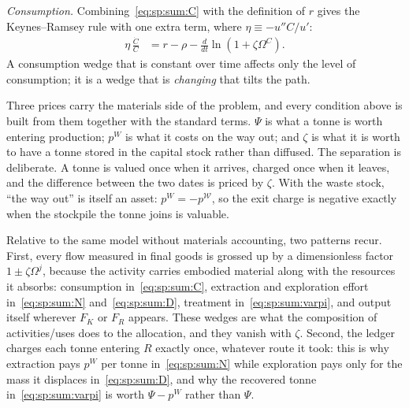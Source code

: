 \emph{Consumption.} Combining~\eqref{eq:sp:sum:C} with the definition of $r$ gives the Keynes--Ramsey rule with one extra term, where $\eta\equiv-u''C/u'$:
\begin{align}
\eta\,\frac{\dot C}{C} &= r-\rho-\frac{d}{dt}\ln\left(1+\zeta\Omega^C\right).
\label{eq:sp:sum:Cgrowth}
\end{align}
A consumption wedge that is constant over time affects only the level of consumption; it is a wedge that is \emph{changing} that tilts the path.



 Three prices carry the materials side of the problem, and every condition above is built from them together with the standard terms. $\Psi$ is what a tonne is worth entering production; $p^W$ is what it costs on the way out; and $\zeta$ is what it is worth to have a tonne stored in the capital stock rather than diffused. The separation is deliberate. A tonne is valued once when it arrives, charged once when it leaves, and the difference between the two dates is priced by $\zeta$. With the waste stock, ``the way out'' is itself an asset: $p^W=-p^{\mathcal W}$, so the exit charge is negative exactly when the stockpile the tonne joins is valuable.

Relative to the same model without materials accounting, two patterns recur. First, every flow measured in final goods is grossed up by a dimensionless factor $1\pm\zeta\Omega^j$, because the activity carries embodied material along with the resources it absorbs: consumption in~\eqref{eq:sp:sum:C}, extraction and exploration effort in~\eqref{eq:sp:sum:N} and~\eqref{eq:sp:sum:D}, treatment in~\eqref{eq:sp:sum:varpi}, and output itself wherever $F_K$ or $F_R$ appears. These wedges are what the composition of activities/uses does to the allocation, and they vanish with $\zeta$. Second, the ledger charges each tonne entering $R$ exactly once, whatever route it took: this is why extraction pays $p^W$ per tonne in~\eqref{eq:sp:sum:N} while exploration pays only for the mass it displaces in~\eqref{eq:sp:sum:D}, and why the recovered tonne in~\eqref{eq:sp:sum:varpi} is worth $\Psi-p^W$ rather than $\Psi$.

